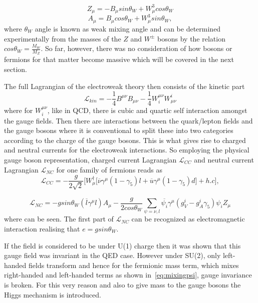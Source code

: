 \begin{equation}
	Z_{\mu}=-B_{\mu}sin\theta_{W}+W^{3}_{\mu}cos\theta_{W}
\end{equation}
\begin{equation}
	A_{\mu}= B_{\mu}cos\theta_{W}+W^{3}_{\mu}sin\theta_{W},
\end{equation}
where $\theta_{W}$ angle is known as weak mixing angle and can be determined experimentally from the masses of the $Z$ and $W^{\pm}$ bosons by the relation
$cos\theta_{W} = \frac{M_{W}}{M_{Z}}$. So far, however, there was no consideration of how bosons or fermions for that matter become massive which will be covered in the next section.

The full Lagrangian of the electroweak theory then consists of the kinetic part
\begin{equation}
\mathcal{L}_{kin}=  -\frac{1}{4} B^{\mu\nu}B_{\mu\nu} -\frac{1}{4} W_{i}^{\mu\nu}W^{i}_{\mu\nu}
\end{equation}
where for $W_{i}^{\mu\nu}$, like in \gls{QCD}, there is cubic and quartic self interaction amongst the gauge fields. Then there are interactions between the quark/lepton fields and the gauge bosons where it is conventional to split these into two categories according to the charge of the gauge bosons.
This is what gives rise to charged and neutral currents for the electroweak interactions. So employing the physical gauge boson representation, charged current Lagrangian $\mathcal{L}_{CC}$ and neutral current Lagrangian $\mathcal{L}_{NC}$ for one family of fermions reads as
\begin{equation}
	\mathcal{L}_{CC}= - \frac{g}{2\sqrt{2}}\Big[W_{\mu}^{\dagger}\big[\overline{\nu}\gamma^{\mu}(1-\gamma_{5})l + \overline{u}\gamma^{\mu}(1-\gamma_{5})d\big] + h.c\Big], 
\label{eq:LC}
\end{equation}

\begin{equation}
	\mathcal{L}_{NC}= - g sin\theta_{W}(\overline{l}\gamma^{\mu}l)A_{\mu} - \frac{g}{2cos\theta_{W}}\sum_{\psi=\nu,l} \overline{\psi_{i}}\gamma^{\mu}(g^{i}_{V} - g^{i}_{A}\gamma_{5})\psi_{i}Z_{\mu}
\label{eq:NC}
\end{equation}
where  can be seen. The first part of $\mathcal{L}_{NC}$ can be recognized as electromagnetic interaction realising that $e=gsin\theta_{W}$. 

If the field is considered to be under U(1) charge then it was shown that this gauge field was invariant in the QED case. However under SU(2), only left-handed fields transform and hence for the fermionic mass term, which mixes right-handed and left-handed terms as shown in~\autoref{eq:mixingpsi}, gauge invariance is broken.
For this very reason and also to give mass to the gauge bosons the Higgs mechanism is introduced.

